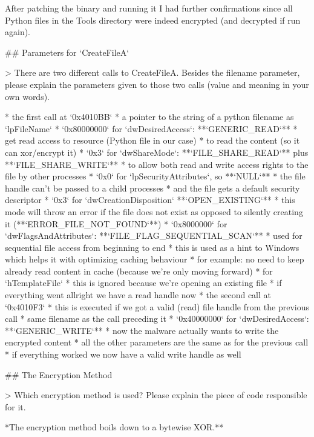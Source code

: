 \begin{markdown}
\noindent After patching the binary and running it I had further confirmations since all Python files in the Tools directory were indeed encrypted (and decrypted if run again).

## Parameters for `CreateFileA`

> \noindent There are two different calls to CreateFileA. Besides the filename parameter, please explain the parameters given to those two calls (value and meaning in your own words).

* the first call at `0x4010BB`
    * a pointer to the string of a python filename as `lpFileName`
    * `0x80000000` for `dwDesiredAccess`: **`GENERIC_READ`**
        * get read access to resource (Python file in our case)
        * to read the content (so it can xor/encrypt it)
    * `0x3` for `dwShareMode`: **`FILE_SHARE_READ`** plus **`FILE_SHARE_WRITE`**
        * to allow both read and write access rights to the file by other processes
    * `0x0` for `lpSecurityAttributes`, so **`NULL`**
        * the file handle can't be passed to a child processes
        * and the file gets a default security descriptor
    * `0x3` for `dwCreationDisposition` **`OPEN_EXISTING`**
        * this mode will throw an error if the file does not exist as opposed to silently creating it (**`ERROR_FILE_NOT_FOUND`**)
    * `0x8000000` for `dwFlagsAndAttributes`: **`FILE_FLAG_SEQUENTIAL_SCAN`**
        * used for sequential file access from beginning to end
        * this is used as a hint to Windows which helps it with optimizing caching behaviour
            * for example: no need to keep already read content in cache (because we're only moving forward)
    * for `hTemplateFile`
        * this is ignored because we're opening an existing file
    * if everything went allright we have a read handle now
* the second call at `0x4010F3`
    * this is executed if we got a valid (read) file handle from the previous call
    * same filename as the call preceding it
    * `0x40000000` for `dwDesiredAccess`: **`GENERIC_WRITE`**
        * now the malware actually wants to write the encrypted content
    * all the other parameters are the same as for the previous call
    * if everything worked we now have a valid write handle as well

## The Encryption Method

> \noindent Which encryption method is used? Please explain the piece of code responsible for it.

\noindent **The encryption method boils down to a bytewise XOR.**


\end{markdown}
